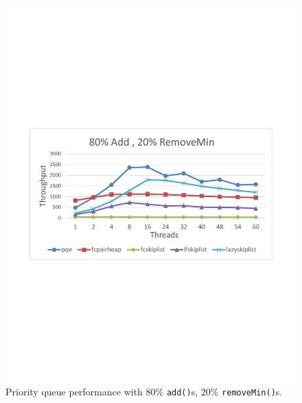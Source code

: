 \begin{figure}[htb]
\begin{minipage}[b]{.495\textwidth}
  \includegraphics[width=\linewidth]{img/sparc-80-20.pdf}
\caption{Priority queue performance with 80\% \texttt{add()}s, 20\% \texttt{removeMin()}s.}
\label{fig:sparc_80}
\end{minipage}%
\end{figure}

